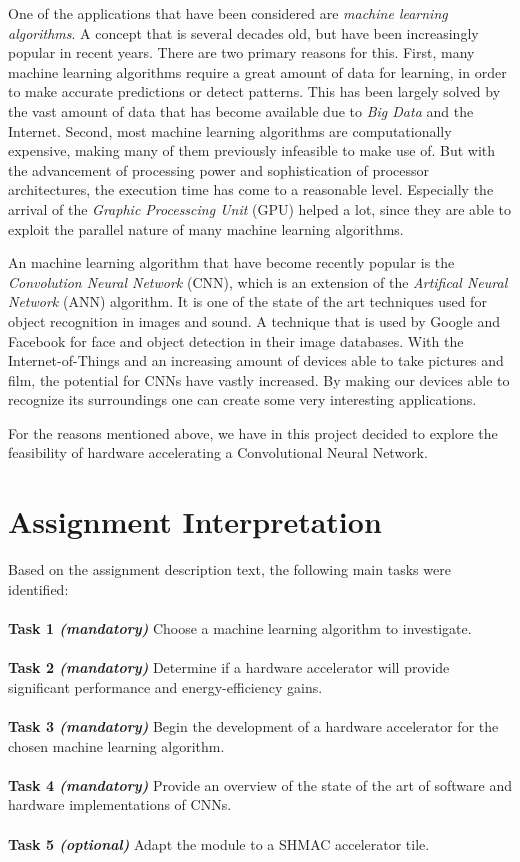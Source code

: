 One of the applications that have been considered are \textit{machine learning algorithms}. A concept that is several decades old, but have been increasingly popular in recent years. There are two primary reasons for this. First, many machine learning algorithms require a great amount of data for learning, in order to make accurate predictions or detect patterns. This has been largely solved by the vast amount of data that has become available due to \textit{Big Data} and the Internet. Second, most machine learning algorithms are computationally expensive, making many of them previously infeasible to make use of. But with the advancement of processing power and sophistication of processor architectures, the execution time has come to a reasonable level. Especially the arrival of the \textit{Graphic Processcing Unit} (GPU) helped a lot, since they are able to exploit the parallel nature of many machine learning algorithms. 

An machine learning algorithm that have become recently popular is the \textit{Convolution Neural Network} (CNN), which is an extension of the \textit{Artifical Neural Network} (ANN) algorithm. It is one of the state of the art techniques used for object recognition in images and sound. A technique that is used by Google and Facebook for face and object detection in their image databases. With the Internet-of-Things and an increasing amount of devices able to take pictures and film, the potential for CNNs have vastly increased. By making our devices able to recognize its surroundings one can create some very interesting applications.

For the reasons mentioned above, we have in this project decided to explore the feasibility of hardware accelerating a Convolutional Neural Network. 

\section{Assignment Interpretation}

Based on the assignment description text, the following main tasks were
identified:\\ \hfil \\ \hfil
\textbf{Task 1 \textit{(mandatory)}} Choose a machine learning algorithm to investigate.  \\ \hfil \\ \hfil
\textbf{Task 2 \textit{(mandatory)}} Determine if a hardware accelerator will provide significant performance and energy-efficiency gains.  \\ \hfil \\ \hfil
\textbf{Task 3 \textit{(mandatory)}} Begin the development of a hardware accelerator for the chosen machine learning algorithm. \\ \hfil \\ \hfil
\textbf{Task 4 \textit{(mandatory)}} Provide an overview of the state of the art of software and hardware implementations of CNNs. \\ \hfil \\ \hfil
\textbf{Task 5 \textit{(optional)}} Adapt the module to a SHMAC accelerator tile. \\ \hfil \\ \hfil

